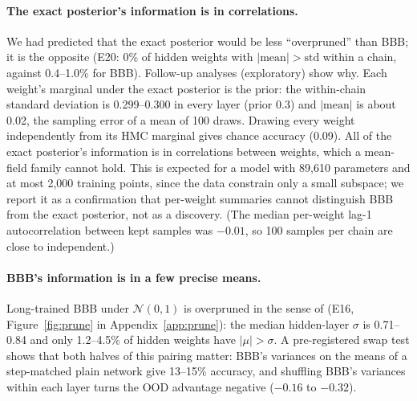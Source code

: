 \documentclass[10pt]{article}
\begin{document}
\paragraph{The exact posterior's information is in correlations.} We had
predicted that the exact posterior would be less ``overpruned'' than BBB; it
is the opposite (E20: 0\% of hidden weights with $|\text{mean}|>\text{std}$
within a chain, against 0.4--1.0\% for BBB). Follow-up analyses (exploratory)
show why. Each weight's marginal under the exact posterior is the prior: the
within-chain standard deviation is 0.299--0.300 in every layer (prior 0.3) and
$|\text{mean}|$ is about 0.02, the sampling error of a mean of 100 draws.
Drawing every weight independently from its HMC marginal gives chance
accuracy (0.09). All of the exact posterior's information is in correlations
between weights, which a mean-field family cannot hold. This is expected for
a model with 89{,}610 parameters and at most 2{,}000 training points, since the
data constrain only a small subspace; we report it as a confirmation that
per-weight summaries cannot distinguish BBB from the exact posterior, not as
a discovery. (The median per-weight lag-1 autocorrelation between kept
samples was $-0.01$, so 100 samples per chain are close to independent.)

\paragraph{BBB's information is in a few precise means.} Long-trained BBB
under $\mathcal N(0,1)$ is overpruned in the sense of
\citet{trippe2018overpruning} (E16, Figure~\ref{fig:prune} in
Appendix~\ref{app:prune}): the median hidden-layer $\sigma$ is 0.71--0.84 and only
1.2--4.5\% of hidden weights have $|\mu|>\sigma$. A pre-registered swap test
shows that both halves of this pairing matter: BBB's variances on the means of
a step-matched plain network give 13--15\% accuracy, and shuffling BBB's
variances within each layer turns the OOD advantage negative ($-0.16$ to
$-0.32$).
\end{document}
